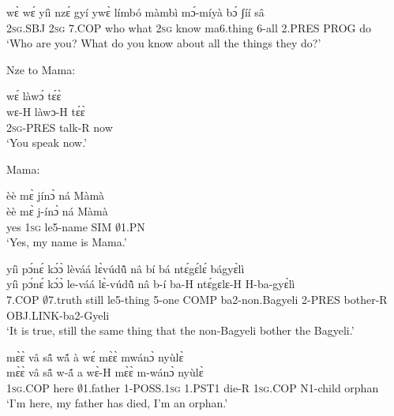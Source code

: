 \begin{exe} 
\exC\label{163}
  \gll wɛ̀ wɛ́ yíì nzɛ́ gyí ywɛ̀ límbó màmbì mɔ́-míyà bɔ́ ʃíí sâ \\
         2\textsc{sg}.SBJ 2\textsc{sg} 7.COP who what 2\textsc{sg} know ma6.thing 6-all 2.PRES PROG do  \\
    \trans `Who are you? What do you know about all the things they do?'
\end{exe}

\noindent Nze to Mama:

\begin{exe} 
\exC\label{164} 
  \glll wɛ́ làwɔ́ tɛ́ɛ̀\\
       wɛ-H làwɔ-H tɛ́ɛ̀ \\
         2\textsc{sg}-PRES talk-R now   \\
    \trans `You speak now.'
\end{exe}

\noindent Mama:

\begin{exe} 
\exC\label{165} 
  \glll èè mɛ̀ jínɔ̀ ná Màmà \\
         èè mɛ̀ j-ínɔ̀ ná Màmà \\
       yes 1\textsc{sg} le5-name SIM $\emptyset$1.PN  \\
    \trans `Yes, my name is Mama.'
\end{exe}

\begin{exe} 
\exC\label{166} 
  \glll yíì pɔ́nɛ́ kɔ́ɔ̀ lèváá lɛ̀vúdũ̂ nâ bí bá ntɛ́gɛ́lɛ́ bágyɛ̀lì \\
       yíì pɔ́nɛ́ kɔ́ɔ̀ le-váá lɛ̀-vúdũ̂ nâ b-í ba-H ntɛ́gɛlɛ-H H-ba-gyɛ̀lì \\
         7.COP $\emptyset$7.truth still le5-thing 5-one COMP ba2-non.Bagyeli 2-PRES bother-R OBJ.LINK-ba2-Gyeli \\
    \trans `It is true, still the same thing that the non-Bagyeli bother the Bagyeli.'
\end{exe}

\begin{exe} 
\exC\label{167} 
  \glll  mɛ̀ɛ̀ vâ sã̂ wã́ à wɛ́ mɛ̀ɛ̀ mwánɔ̀ nyùlɛ̀ \\
        mɛ̀ɛ̀ vâ sã̂ w-ã́ a wɛ̀-H mɛ̀ɛ̀ m-wánɔ̀ nyùlɛ̀ \\
          1\textsc{sg}.COP here $\emptyset$1.father 1-POSS.1\textsc{sg} 1.PST1 die-R 1\textsc{sg}.COP N1-child orphan  \\
    \trans `I'm here, my father has died, I'm an orphan.'
\end{exe}

